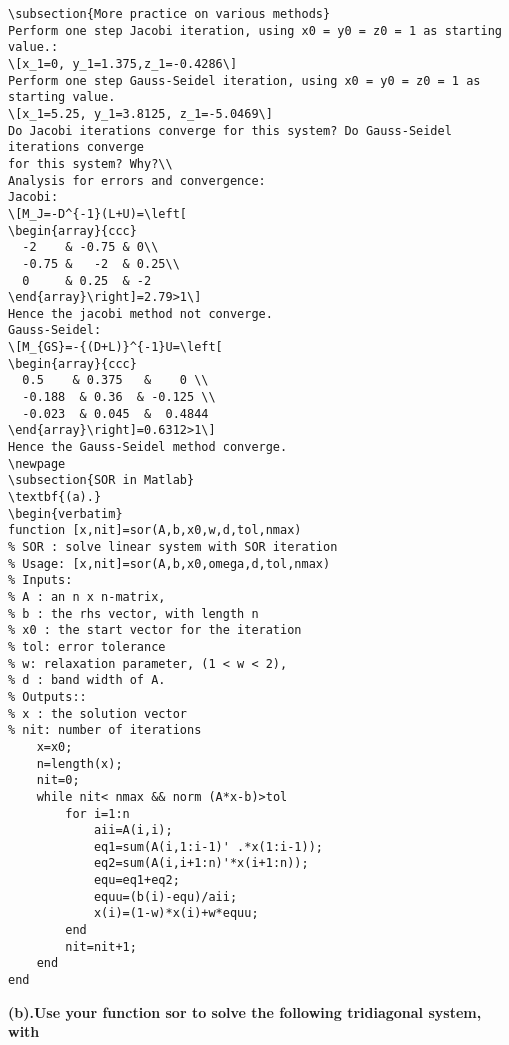 \begin{verbatim}
\subsection{More practice on various methods}
Perform one step Jacobi iteration, using x0 = y0 = z0 = 1 as starting value.:
\[x_1=0, y_1=1.375,z_1=-0.4286\]
Perform one step Gauss-Seidel iteration, using x0 = y0 = z0 = 1 as starting value.
\[x_1=5.25, y_1=3.8125, z_1=-5.0469\]
Do Jacobi iterations converge for this system? Do Gauss-Seidel iterations converge
for this system? Why?\\
Analysis for errors and convergence:
Jacobi:
\[M_J=-D^{-1}(L+U)=\left[
\begin{array}{ccc}
  -2    & -0.75 & 0\\
  -0.75 &   -2  & 0.25\\
  0     & 0.25  & -2
\end{array}\right]=2.79>1\]
Hence the jacobi method not converge.
Gauss-Seidel:
\[M_{GS}=-{(D+L)}^{-1}U=\left[
\begin{array}{ccc}
  0.5    & 0.375   &    0 \\
  -0.188  & 0.36  & -0.125 \\
  -0.023  & 0.045  &  0.4844
\end{array}\right]=0.6312>1\]
Hence the Gauss-Seidel method converge.
\newpage
\subsection{SOR in Matlab}
\textbf{(a).}
\begin{verbatim}
function [x,nit]=sor(A,b,x0,w,d,tol,nmax)
% SOR : solve linear system with SOR iteration
% Usage: [x,nit]=sor(A,b,x0,omega,d,tol,nmax)
% Inputs:
% A : an n x n-matrix,
% b : the rhs vector, with length n
% x0 : the start vector for the iteration
% tol: error tolerance
% w: relaxation parameter, (1 < w < 2),
% d : band width of A.
% Outputs::
% x : the solution vector
% nit: number of iterations
    x=x0;
    n=length(x);
    nit=0;
    while nit< nmax && norm (A*x-b)>tol
        for i=1:n
            aii=A(i,i);
            eq1=sum(A(i,1:i-1)' .*x(1:i-1));
            eq2=sum(A(i,i+1:n)'*x(i+1:n));
            equ=eq1+eq2;
            equu=(b(i)-equ)/aii;
            x(i)=(1-w)*x(i)+w*equu;
        end
        nit=nit+1;
    end
end
\end{verbatim}
\textbf{(b).Use your function sor to solve the following tridiagonal system, with}
